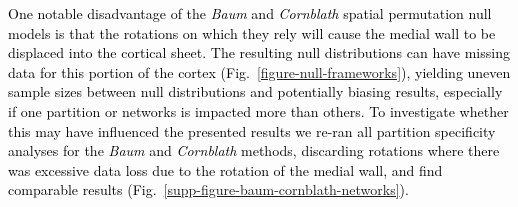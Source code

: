 \documentclass[12pt,aps,pra,reprint,showkeys]{revtex4-1}
\newcommand{\nimg}[1]{\textcolor{black}{{#1}}}
\begin{document}
\nimg{One notable disadvantage of the \textit{Baum} and \textit{Cornblath} spatial permutation null models is that the rotations on which they rely will cause the medial wall to be displaced into the cortical sheet.
The resulting null distributions can have missing data for this portion of the cortex (Fig.~\ref{figure-null-frameworks}), yielding uneven sample sizes between null distributions and potentially biasing results, especially if one partition or networks is impacted more than others.
To investigate whether this may have influenced the presented results we re-ran all partition specificity analyses for the \textit{Baum} and \textit{Cornblath} methods, discarding rotations where there was excessive data loss due to the rotation of the medial wall, and find comparable results (Fig.~\ref{supp-figure-baum-cornblath-networks}).}

\end{document}
